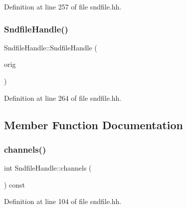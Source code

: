 Definition at line 257 of file sndfile.\+hh.

\mbox{\label{class_sndfile_handle_af9c8bc95a16a9cc913586623c29a3bcd}} 
\subsubsection{\texorpdfstring{SndfileHandle()}{SndfileHandle()}\hspace{0.1cm}{\footnotesize\ttfamily [6/6]}}
{\footnotesize\ttfamily Sndfile\+Handle\+::\+Sndfile\+Handle (\begin{DoxyParamCaption}\item[{const \mbox{\hyperlink{class_sndfile_handle}{Sndfile\+Handle}} \&}]{orig }\end{DoxyParamCaption})\hspace{0.3cm}{\ttfamily [inline]}}



Definition at line 264 of file sndfile.\+hh.



\subsection{Member Function Documentation}
\mbox{\label{class_sndfile_handle_a710add6f87468ca8f9dc444bf35e7ebc}} 
\subsubsection{\texorpdfstring{channels()}{channels()}}
{\footnotesize\ttfamily int Sndfile\+Handle\+::channels (\begin{DoxyParamCaption}\item[{void}]{ }\end{DoxyParamCaption}) const\hspace{0.3cm}{\ttfamily [inline]}}



Definition at line 104 of file sndfile.\+hh.

\mbox{\label{class_sndfile_handle_a3646fc2e30b01abefe91524e80da6d6e}} 
